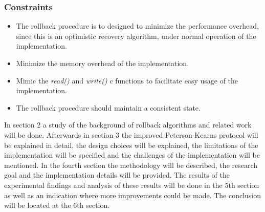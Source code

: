 \documentclass[twocolumn, a4paper,11pt]{article}%
\begin{document}
\subsubsection*{Constraints}
\begin{itemize}
	\item The rollback procedure is to designed to minimize the performance overhead, since this is an optimistic recovery algorithm, under normal operation of the implementation. 
	\item Minimize the memory overhead of the implementation. 
	\item Mimic the \textit{read()} and \textit{write()} c functions to facilitate easy usage of the implementation.
	\item The rollback procedure should maintain a consistent state.
\end{itemize}
\par In section 2  a study of the background of rollback algorithms and related work will  be done. Afterwards in section 3 the improved Peterson-Kearns protocol will be explained in detail, the design choices will be explained, the limitations of the implementation will be specified and the challenges of the implementation will be mentioned. In the fourth section the methodology will be described, the research goal and the implementation details will be provided.  The results of the experimental findings and analysis of these results will be done in the 5th section as well as an indication where more improvements could be made. The conclusion will be located at the 6th section.
\end{document}
